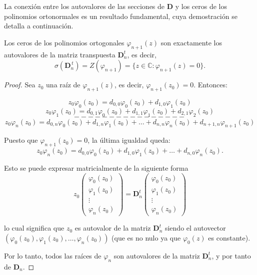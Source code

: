 La conexión entre los autovalores de las secciones de $\mathbf{D}$ y los ceros de los polinomios ortonormales es un resultado fundamental, cuya demostración se detalla a continuación.

\begin{proposition}\label{prop:eigenvalues_zeros}
  Los ceros de los polinomios ortogonales $\varphi_{n+1}(z)$ son exactamente los autovalores de la matriz transpuesta $\mathbf{D}_n^t$, es decir,
  \[
    \sigma(\mathbf{D}_n^{\,t}) = Z(\varphi_{n+1}) = \{z \in \mathbb{C} : \varphi_{n+1}(z) = 0\}.
  \]
\end{proposition}


\begin{proof}
  \noindent Sea $z_0$ una raíz de $\varphi_{n+1}(z)$, es decir, $\varphi_{n+1}(z_0)=0$. Entonces:

  $$
    z_0\varphi_0(z_0)= d_{0,0}\varphi_0(z_0)+d_{1,0}\varphi_1(z_0)
  $$
  $$
    z_0\varphi_1(z_0)= d_{0,1}\varphi_0(z_0)+d_{1,1}\varphi_1(z_0)+d_{2,1}\varphi_{2}(z_0)
  $$
  $$
    ----------------
  $$
  $$
    z_0\varphi_n(z_0)= d_{0,n}\varphi_0(z_0)+d_{1,n}\varphi_1(z_0)+\dots+d_{n,n}\varphi_n(z_0)+d_{n+1,n}\varphi_{n+1}(z_0)
  $$

  \noindent Puesto que $\varphi_{n+1}(z_0)=0$, la última igualdad queda:
  $$
    z_0\varphi_n(z_0)= d_{0,0}\varphi_0(z_0)+d_{1,0}\varphi_1(z_0)+\dots+d_{n,0}\varphi_n(z_0).
  $$

  \noindent Esto se puede expresar matricialmente de la siguiente forma
  $$
    z_0\begin{pmatrix} \varphi_0(z_0) \\ \varphi_1(z_0) \\  \vdots \\ \varphi_n(z_0) \end{pmatrix} = \mathbf{D}^{t}_n \begin{pmatrix} \varphi_0(z_0) \\ \varphi_1(z_0) \\  \vdots \\ \varphi_n(z_0) \end{pmatrix}
  $$

  \noindent lo cual significa que $z_0$ es autovalor de la matriz $\mathbf{D}^{t}_n$ siendo el autovector \newline
  $(\varphi_0(z_0),\varphi_1(z_0),\dots,\varphi_n(z_0))$ (que es no nulo ya que $\varphi_0(z)$ es constante).

  \noindent Por lo tanto, todos las raíces de $\varphi_n$ son autovalores de la matriz $\mathbf{D}^{t}_n$, y por tanto de $\mathbf{D}_n$.
\end{proof}

